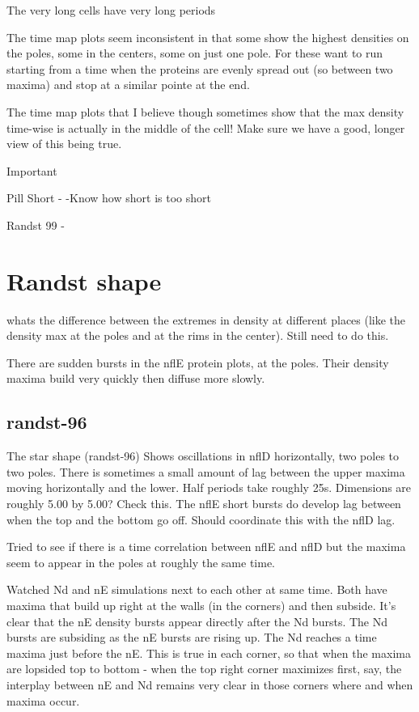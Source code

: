 \documentclass[letterpaper,twocolumn,amsmath,amssymb,pre]{revtex4-1}
\begin{document}
The very long cells have very long periods

The time map plots seem inconsistent in that some show the highest
densities on the poles, some in the centers, some on just one pole.
For these want to run starting from a time when the proteins are
evenly spread out (so between two maxima) and stop at a similar pointe
at the end.

The time map plots that I believe though sometimes show that the max
density time-wise is actually in the middle of the cell!  Make sure we
have a good, longer view of this being true.


Important


Pill Short -
     -Know how short is too short

Randst 99 -

\section{Randst shape}
whats the difference between the extremes in density at different
places (like the density max at the poles and at the rims in the
center).  Still need to do this.

There are sudden bursts in the nflE protein plots, at the poles. Their
density maxima build very quickly then diffuse more slowly.

\subsection{randst-96}
The star shape (randst-96) Shows oscillations in nflD horizontally,
two poles to two poles.  There is sometimes a small amount of lag
between the upper maxima moving horizontally and the lower.  Half
periods take roughly 25s. Dimensions are roughly 5.00 by 5.00?  Check
this.  The nflE short bursts do develop lag between when the top and
the bottom go off.  Should coordinate this with the nflD lag.

Tried to see if there is a time correlation between nflE and nflD but
the maxima seem to appear in the poles at roughly the same time.

Watched Nd and nE simulations next to each other at same time.  Both
have maxima that build up right at the walls (in the corners) and then
subside.  It's clear that the nE density bursts appear directly after
the Nd bursts.  The Nd bursts are subsiding as the nE bursts are
rising up.  The Nd reaches a time maxima just before the nE.  This is
true in each corner, so that when the maxima are lopsided top to
bottom - when the top right corner maximizes first, say, the interplay
between nE and Nd remains very clear in those corners where and when
maxima occur.
\end{document}
